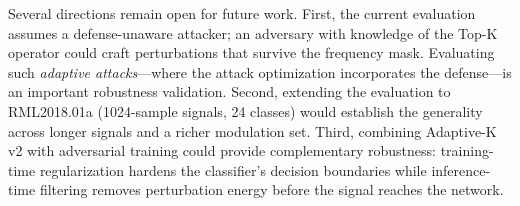 Several directions remain open for future work.  First, the current evaluation
assumes a defense-unaware attacker; an adversary with knowledge of the Top-K
operator could craft perturbations that survive the frequency mask.  Evaluating
such \emph{adaptive attacks}---where the attack optimization incorporates the
defense---is an important robustness validation.  Second, extending the
evaluation to RML2018.01a (1024-sample signals, 24 classes) would establish
the generality across longer signals and a richer modulation set.  Third,
combining Adaptive-K v2 with adversarial training could provide complementary
robustness: training-time regularization hardens the classifier's decision
boundaries while inference-time filtering removes perturbation energy before
the signal reaches the network.
